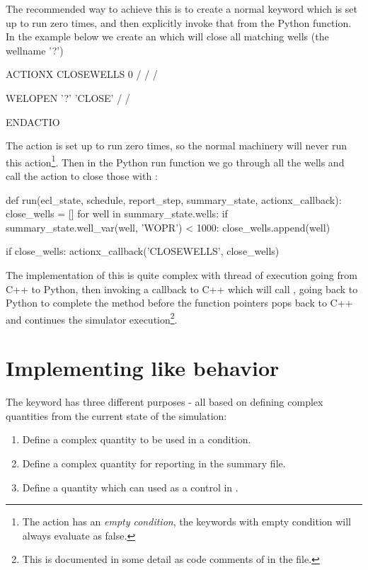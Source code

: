 The recommended way to achieve this is to create a normal \actionx{} keyword
which is set up to run zero times, and then explicitly invoke that from the
Python  function. In the example below we create an \actionx{}
 which will close all matching wells (the wellname '?')
\begin{deck}
ACTIONX
  CLOSEWELLS 0 /
  /
/

WELOPEN
  '?' 'CLOSE' /
/

ENDACTIO
\end{deck}
The  action is set up to run zero times, so the normal
\actionx{} machinery will never run this action\footnote{The 
action has an \emph{empty condition}, the \actionx{} keywords with empty
condition will always evaluate as false.}. Then in the Python run function we go
through all the wells and call the  action to close those
with :
\begin{code}
def run(ecl_state, schedule, report_step, summary_state, actionx_callback):
    close_wells = []
    for well in summary_state.wells:
        if summary_state.well_var(well, 'WOPR') < 1000:
           close_wells.append(well)

    if close_wells:
        actionx_callback('CLOSEWELLS', close_wells)
\end{code}
The implementation of this is quite complex with thread of execution going from
C++ to Python, then invoking a callback to C++ which will call
, going back to Python to
complete the  method before the function pointers pops back to
C++ and continues the simulator execution\footnote{This is documented in some
detail as code comments of  in the
 file.}.


\section{Implementing \udq{} like behavior}
The \udq{} keyword has three different purposes - all based on defining
complex quantities from the current state of the simulation:

\begin{enumerate}
\item Define a complex quantity to be used in a \actionx{} condition.
\item Define a complex quantity for reporting in the summary file.
\item Define a quantity which can used as a control in .
\end{enumerate}

